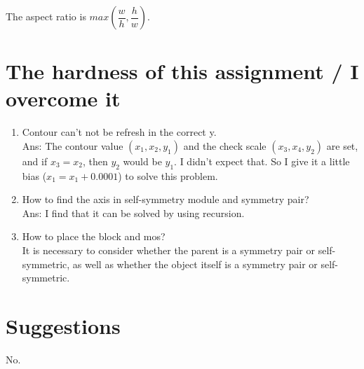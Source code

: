 \documentclass{article}
\begin{document}
The aspect ratio is $max\left(\dfrac{w}{h}, \dfrac{h}{w}\right)$.



\pagebreak
\section{The hardness of this assignment / I overcome it}

\begin{enumerate}
    \item Contour can't not be refresh in the correct y.\\
    Ans: The contour value $(x_1, x_2, y_1)$ and the check scale $(x_3, x_4, y_2)$ are set, and if $x_3 = x_2$, then $y_2$ would be $y_1$. I didn't expect that. So I give it a little bias ($x_1=x_1+0.0001$) to solve this problem.

    \item How to find the axis in self-symmetry module and symmetry pair?\\
    Ans: I find that it can be solved by using recursion.
    \item How to place the block and mos?\\
It is necessary to consider whether the parent is a symmetry pair or self-symmetric, as well as whether the object itself is a symmetry pair or self-symmetric.
    

\end{enumerate}


\section{Suggestions}

No.
\end{document}
